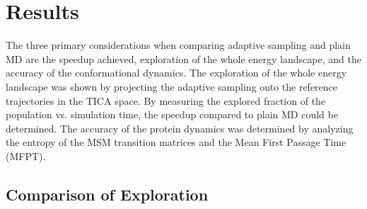 \begin{table}[H]

\centering
\caption{ExTASY parameters for MD and analysis, for both plain MD and adaptive sampling.}\label{table:param1}
\end{table}


\section{\label{sec:results}Results}

The three primary considerations when comparing adaptive sampling and plain MD are the speedup achieved, exploration of the whole energy landscape, and the accuracy of the conformational dynamics.
The exploration of the whole energy landscape was shown by projecting the adaptive sampling onto the reference trajectories in the TICA space. By measuring the explored fraction of the population vs. simulation time, the speedup compared to plain MD could be determined. The accuracy of the protein dynamics was determined by analyzing the entropy of the MSM transition
matrices and the Mean First Passage Time (MFPT).



\subsection{\label{sec:time-fold}Comparison of Exploration}

